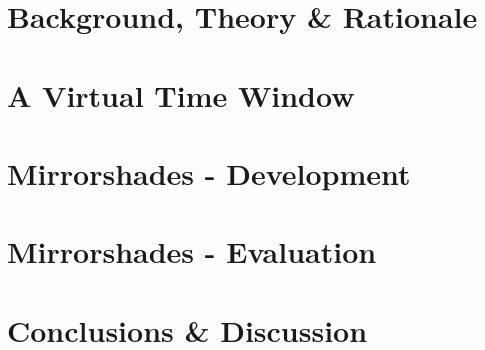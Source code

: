 \documentclass{report}
\begin{document}
\chapter{Background, Theory \& Rationale}
\graphicspath{ {03_background/images/} }

%


\chapter{A Virtual Time Window}
\graphicspath{ {04_vtw/images/} }



\chapter{Mirrorshades - Development}
\graphicspath{ {05_mirrorshades_design_implementation/images/} }



\chapter{Mirrorshades - Evaluation}
\graphicspath{ {06_mirrorshades_studies_results/images/} }



\chapter{Conclusions \& Discussion}




\end{document}
